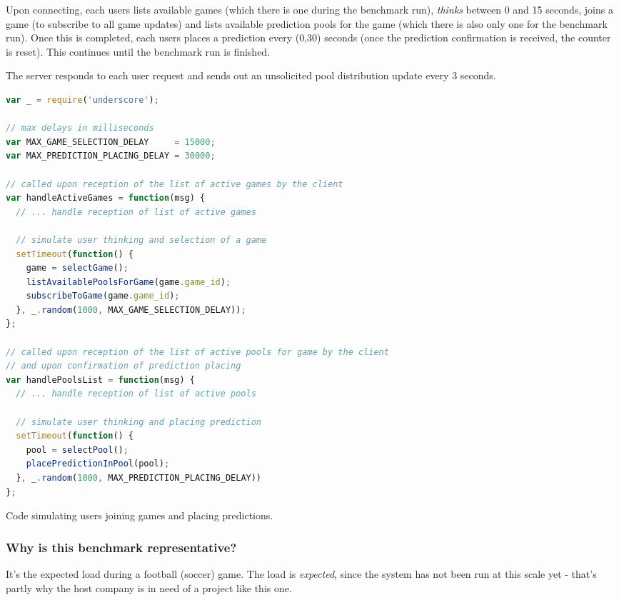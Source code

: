 \documentclass{uvamscse}
\begin{document}
Upon connecting, each users lists available games (which there is one during the benchmark run), \textit{thinks} between 0 and 15 seconds, joins a game (to subscribe to all game updates) and lists available prediction pools for the game (which there is also only one for the benchmark run). Once this is completed, each users places a prediction every (0,30) seconds (once the prediction confirmation is received, the counter is reset). This continues until the benchmark run is finished.

The server responds to each user request and sends out an unsolicited pool distribution update every 3 seconds.

\begin{sourcecode}
\begin{lstlisting}[language=javascript]
var _ = require('underscore');

// max delays in milliseconds
var MAX_GAME_SELECTION_DELAY     = 15000;
var MAX_PREDICTION_PLACING_DELAY = 30000;

// called upon reception of the list of active games by the client
var handleActiveGames = function(msg) {
  // ... handle reception of list of active games

  // simulate user thinking and selection of a game
  setTimeout(function() {
    game = selectGame();
    listAvailablePoolsForGame(game.game_id);
    subscribeToGame(game.game_id);
  }, _.random(1000, MAX_GAME_SELECTION_DELAY));
};

// called upon reception of the list of active pools for game by the client
// and upon confirmation of prediction placing
var handlePoolsList = function(msg) {
  // ... handle reception of list of active pools

  // simulate user thinking and placing prediction
  setTimeout(function() {
    pool = selectPool();
    placePredictionInPool(pool);
  }, _.random(1000, MAX_PREDICTION_PLACING_DELAY))
};

\end{lstlisting}
\caption{Code simulating users joining games and placing predictions.}
\end{sourcecode}

\subsubsection{Why is this benchmark representative?}

It's the expected load during a football (soccer) game. The load is \textit{expected}, since the system has not been run at this scale yet - that's partly why the host company is in need of a project like this one.
\end{document}
